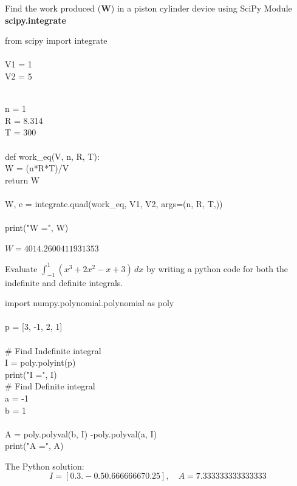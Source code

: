 \begin{posttest}[\textcolor{red}{End of Module 9 Quiz}]
\item Find the work produced ({\bf W}) in a piston cylinder device using SciPy Module {\bf scipy.integrate}
\begin{mysolution}
\begin{boxB}
from scipy import integrate\\
\\
 V1 = 1 \\
V2 = 5 \\
\\
\end{boxB}

\begin{boxB}

n = 1\\
 R = 8.314\\
 T = 300\\
\\
 def work\_eq(V, n, R, T):\\
\hspace*{1cm} W = (n*R*T)/V  \\
\hspace*{1cm}return W\\
\\
 W, e = integrate.quad(work\_eq, V1, V2, args=(n, R, T,))\\
\\
 print("W =", W)
\end{boxB}

$W = 4014.2600411931353$
\end{mysolution}
\item Evaluate $\int_{-1}^1(𝑥^3 +2𝑥^2-𝑥+3)\,dx$ by writing a python code for both the indefinite and definite integrals.
\begin{mysolution}

\begin{boxB}
import numpy.polynomial.polynomial as poly\\
\\
 p = [3, -1, 2, 1]\\
\\
 \# Find Indefinite integral\\
 I = poly.polyint(p)\\
 print("I =", I)\\

 \# Find Definite integral\\
 a = -1\\
 b = 1\\
\\
 A = poly.polyval(b, I) -poly.polyval(a, I)\\
 print("A =", A)
\end{boxB}

The Python solution: 
\[ I = [ 0.  3.  -0.5  0.66666667  0.25 ],\quad A = 7.333333333333333\]
\end{mysolution}

\end{posttest}

